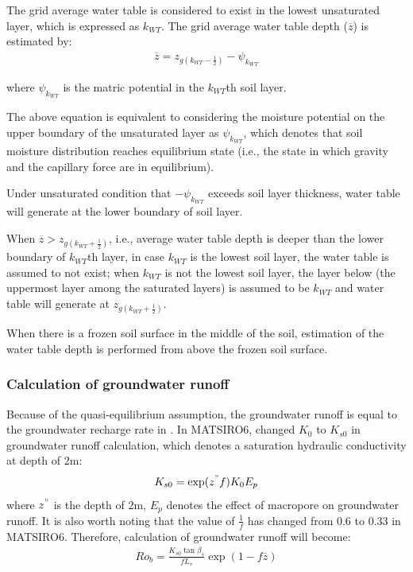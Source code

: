 The grid average water table is considered to exist in the lowest unsaturated layer, which is expressed as \(k_{WT}\). The grid average water table depth (\(\overline{z}\)) is estimated by: \begin{eqnarray}
\overline{z} = z_{g(k_{WT}-\frac1 2)} - \psi_{k_{WT}}
\label{eq279}
\end{eqnarray}

where \(\psi_{k_{WT}}\) is the matric potential in the \(k_{WT}\)th soil layer.

The above equation is equivalent to considering the moisture potential on the upper boundary of the unsaturated layer as \(\psi_{k_{WT}}\), which denotes that soil moisture distribution reaches
equilibrium state (i.e., the state in which gravity and the capillary force are in equilibrium).

Under unsaturated condition that \(-\psi_{k_{WT}}\) exceeds soil layer thickness, water table will generate at the lower boundary of soil layer.

When \(\overline{z} > z_{g(k_{WT}+\frac{1}2)}\), i.e., average water table depth is deeper than the lower boundary of \(k_{WT}\)th layer, in case \(k_{WT}\) is the lowest soil layer, the water table
is assumed to not exist; when \(k_{WT}\) is not the lowest soil layer, the layer below (the uppermost layer among the saturated layers) is assumed to be \(k_{WT}\) and water table will generate at
\(z_{g(k_{WT}+\frac{1}2)}\).

When there is a frozen soil surface in the middle of the soil, estimation of the water table depth is performed from above the frozen soil surface.

\subsubsection{Calculation of groundwater runoff}\label{calculation-of-groundwater-runoff}

Because of the quasi-equilibrium assumption, the groundwater runoff is equal to the groundwater recharge rate in \hyperref[eq272]{}. In MATSIRO6, \citet{Hirabayashi2004-mw} changed \(K_0\) to
\(K_{s0}\) in groundwater runoff calculation, which denotes a saturation hydraulic conductivity at depth of 2m: \begin{eqnarray}
K_{s0}=\exp (z^"f)K_0 E_p
\end{eqnarray} where \(z^"\) is the depth of 2m, \(E_p\) denotes the effect of macropore on groundwater runoff. It is also worth noting that the value of \(\frac1f\) has changed from 0.6 to 0.33 in MATSIRO6.
Therefore, calculation of groundwater runoff will become: \begin{eqnarray}
Ro_b = \frac{K_{s0} \tan\beta_s}{f L_s}\exp(1-f \overline{z})
\label{eq280}
\end{eqnarray}

